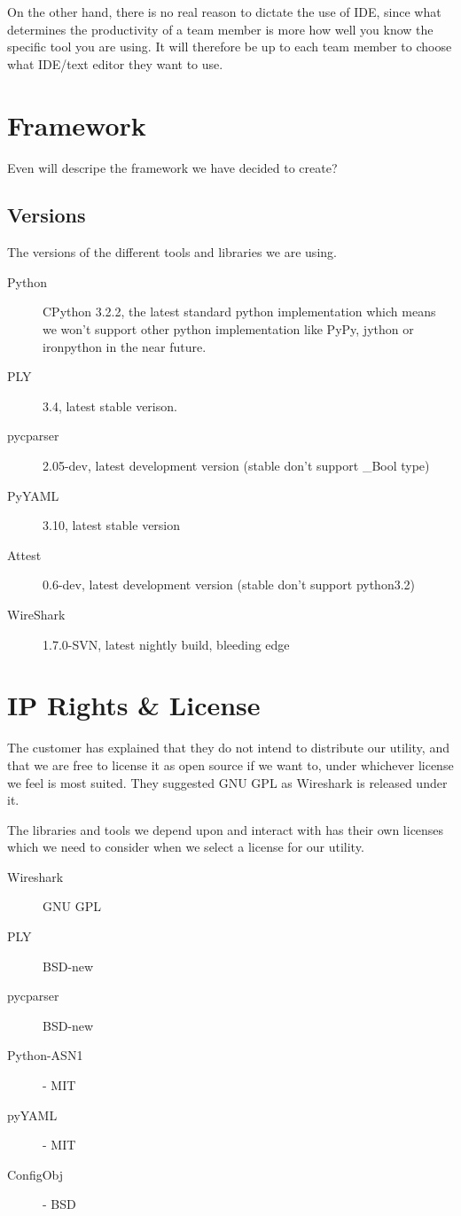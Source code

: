 On the other hand, there is no real reason to dictate the use of IDE, since
what determines the productivity of a team member is more how well you know
the specific tool you are using. It will therefore be up to each team member
to choose what IDE/text editor they want to use.


\section{Framework}
\label{sec:pre:framework}
Even will descripe the framework we have decided to create?

\subsection{Versions}
The versions of the different tools and libraries we are using.
\begin{description}
	\item[Python] CPython 3.2.2, the latest standard python implementation
		which means we won’t support other python implementation like PyPy,
		jython or ironpython in the near future.
	\item[PLY] 3.4, latest stable verison.
	\item[pycparser] 2.05-dev, latest development version (stable don't
		support \_Bool type)
	\item[PyYAML] 3.10, latest stable version
	\item[Attest] 0.6-dev, latest development version (stable don’t
		support python3.2)
	\item[WireShark] 1.7.0-SVN, latest nightly build, bleeding edge
\end{description}


\section{IP Rights \& License}
\label{sec:pre:license}
The customer has explained that they do not intend to distribute our utility,
and that we are free to license it as open source if we want to, under
whichever license we feel is most suited. They suggested GNU GPL as Wireshark
is released under it.

The libraries and tools we depend upon and interact with has their own licenses
which we need to consider when we select a license for our utility.
\begin{description}
	\item[Wireshark] GNU GPL
	\item[PLY] BSD-new
	\item[pycparser] BSD-new
	\item[Python-ASN1] - MIT
	\item[pyYAML] - MIT
	\item[ConfigObj] - BSD
\end{description}


